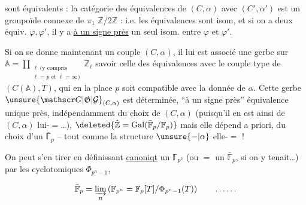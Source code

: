 

sont équivalents : la catégorie des équivalences
de $(C,\alpha)$ avec $(C',\alpha')$ est un groupoïde connexe de
$\pi_1$ $\mathbb Z/2\mathbb Z$ : i.e.   les équivalences sont
isom, et si on a deux équiv. $\varphi,\varphi'$, il y a \uline{à un
signe près} un seul isom. entre $\varphi$ et $\varphi'$.

Si on se donne maintenant un couple $(C,\alpha)$,
il lui est associé une  gerbe sur $\mathbb A=\prod_{\substack{\ell\ (\text{y compris}\\\ell=p\text{ et }\ell=\infty)}}\mathbb Z_\ell$
 savoir celle des équivalences  avec le  couple
type de $(C(\mathbb A),T)$, qui en la place $p$ soit
compatible avec la donnée de $\alpha$. Cette gerbe
$\unsure{\mathscr G|\mathfrak G|\mathcal G}_{(C,\alpha)}$ est déterminée, ``à un signe près''  équivalence
unique près, indépendamment du choix de $(C,\alpha)$
(puisqu'il en est ainsi de $(C,\alpha)$ lui-$=$\ldots), 
$\deleted{\hat{\mathbb Z}=\mathrm{Gal}(\bar{\mathbb F}_p/\mathbb F_p)}$  mais elle dépend
a priori,  du choix d'un $\bar{\mathbb F}_p$  -- tout comme la structure $\unsure{-|\alpha}$ elle-$=$ !


On peut s'en tirer en définissant \uline{canoniqt} un
$\mathbb F_{p^2}$ (ou $=$ un $\bar{\mathbb F}_p$, si on y tenait\ldots) par les 
cyclotomiques $\Phi_{p^n-1}$,

\[
\bar{\mathbb F}_p=\varinjlim_n\left(\mathbb F_{p^n}=\mathbb F_p[T]/\Phi_{p^n-1}(T)\right)
\qquad \ldots\ldots
\]
\unsure{;}
